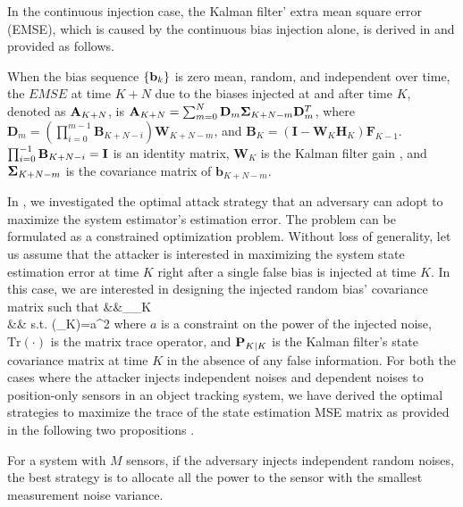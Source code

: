 \documentclass{article}
\begin{document}
In the continuous injection case, the Kalman filter' extra mean square error (EMSE), which is caused by the continuous bias injection alone, is derived in \cite{niu:summer_ext_faculty_12} and provided as follows.  
\begin{proposition}
\label{lem:mse_bias_continuous}
When the  bias sequence $\{{\bf b}_k\}$ is zero mean, random, and independent over time, the $EMSE$ at time $K+N$ due to the biases injected at and after time $K$, denoted as ${\bf A}_{K+N}$,  is $\mathbf{A}_{K+N}=\sum_{m=0}^{N}\mathbf{D}_{m}{\bf \Sigma}_{K+N-m} \mathbf{D}^T_{m}$, where $\mathbf{D}_{m}=\left(\prod_{i=0}^{m-1}\mathbf{B}_{K+N-i}\right)\mathbf{W}_{K+N-m}$, and $\mathbf{B}_{K}= \left(\mathbf{I}-\mathbf{W}_{K}\mathbf{H}_{K}\right) \mathbf{F}_{K-1}$. $\prod_{i=0}^{-1} \mathbf{B}_{K+N-i}={\bf I}$ is an identity matrix, $\mathbf{W}_{K}$ is the Kalman filter gain \cite{YBS:book}, and ${\bf \Sigma}_{K+N-m}$ is the covariance matrix of $\mathbf{b}_{K+N-m}$.
\end{proposition}

In \cite{lu&niu:fusion14}, we investigated the optimal attack strategy that an adversary can adopt to maximize the system estimator's estimation error. The problem can be formulated as a constrained optimization problem. Without loss of generality,  let us assume that the attacker is interested in maximizing the system state  estimation error at time $K$ right after a single false bias is injected at time $K$. In this case, we are interested in designing the injected random bias' covariance matrix such that 
\beqa 
	&&\max_{{\bf \Sigma}_K}  \nn\\ 
	&& s.t. \;\;\; ({\bf \Sigma}_K)=a^2
	\label{eq:max_trace}
\eeqa
where $a$ is a constraint on the power of the injected noise, $\mathrm{Tr}(\cdot)$ is the matrix trace operator, and ${\bf P}_{K|K}$ is the Kalman filter's state   covariance matrix at time $K$ in the absence of any false information. For both the cases where the attacker injects independent noises and dependent noises to position-only sensors in an object tracking system, we have derived the optimal strategies to  maximize the trace of the state estimation MSE matrix  as provided in the following two propositions \cite{lu&niu:fusion14}. 
\begin{proposition}
\label{pro:attack-ind}
For a system with $M$ sensors, if the adversary injects independent random noises, the best strategy  is to allocate all the power to the sensor with the smallest measurement noise variance.
\end{proposition}
\end{document}
